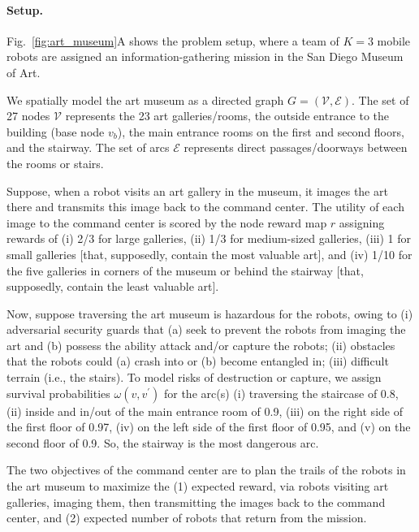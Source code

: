 \documentclass[fleqn,10pt,lineno]{wlpeerj}
\begin{document}
\paragraph{Setup.}
Fig.~\ref{fig:art_museum}A shows the problem setup, where a team of $K=3$ mobile robots are assigned an information-gathering mission in the San Diego Museum of Art. 

We spatially model the art museum as a directed graph $G=(\mathcal{V}, \mathcal{E})$.
The set of 27 nodes $\mathcal{V}$ represents the 23 art galleries/rooms, the outside entrance to the building (base node $v_b$), the main entrance rooms on the first and second floors, and the stairway.
The set of arcs $\mathcal{E}$ represents direct passages/doorways between the rooms or stairs.

Suppose, when a robot visits an art gallery in the museum, it images the art there and transmits this image back to the command center.
The utility of each image to the command center is scored by
the node reward map $r$ assigning rewards of
(i) 2/3 for large galleries,
(ii) 1/3 for medium-sized galleries,
(iii) 1 for small galleries [that, supposedly, contain the most valuable art], and
(iv) 1/10 for the five galleries in corners of the museum or behind the stairway [that, supposedly, contain the least valuable art].

Now, suppose traversing the art museum is hazardous for the robots, owing to
(i) adversarial security guards that (a) seek to prevent the robots from imaging the art and (b) possess the ability attack and/or capture the robots;
(ii) obstacles that the robots could (a) crash into or (b) become entangled in;
(iii) difficult terrain (i.e., the stairs).
To model risks of destruction or capture, we assign survival probabilities $\omega(v,v^\prime)$ for the arc(s)
(i) traversing the staircase of 0.8,
(ii) inside and in/out of the main entrance room of 0.9,
(iii) on the right side of the first floor of 0.97,
(iv) on the left side of the first floor of 0.95,
and
(v) on the second floor of 0.9.
So, the stairway is the most dangerous arc.


The two objectives of the command center are to plan the trails of the robots in the art museum to maximize the (1) expected reward, via robots visiting art galleries, imaging them, then transmitting the images back to the command center, and (2) expected number of robots that return from the mission. 
\end{document}
